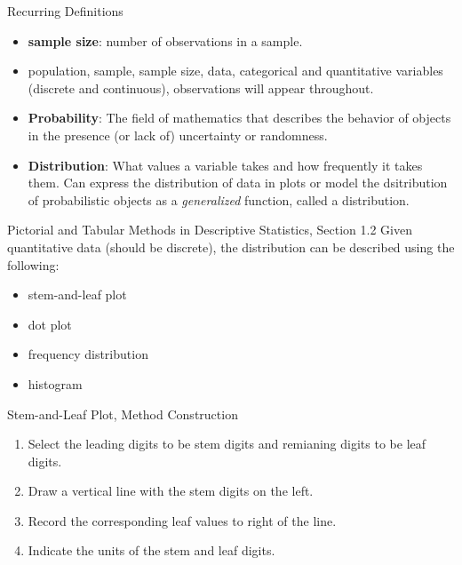 \documentclass{beamer}
\newcommand{\blue}[1]{{\color{blue} #1}}
\newcommand{\red}[1]{{\color{red} #1}}
\begin{document}
\begin{frame}{Recurring Definitions}
    \begin{itemize}
        \item {\bf sample size}: number of observations in a sample.
        \item population, sample, sample size, data, categorical and quantitative variables (discrete and continuous), observations will appear throughout.
        \item {\bf Probability}: The field of mathematics that describes the behavior of objects in the presence (or lack of) uncertainty or randomness.
        \item {\bf Distribution}:  What values a variable takes and how frequently it takes them. Can express the distribution of  data in plots or model the dsitribution of probabilistic objects as a {\it generalized} function, called a distribution.
    \end{itemize}
\end{frame}

\begin{frame}{Pictorial and Tabular Methods in Descriptive Statistics, Section 1.2}
    Given quantitative data (should be discrete), the distribution can be described using the following:
    \begin{itemize}
        \item stem-and-leaf plot
        \item dot plot
        \item frequency distribution
        \item histogram
    \end{itemize}
\end{frame}

\begin{frame}{Stem-and-Leaf Plot, Method}
    Construction
    \begin{enumerate}
        \item Select the \blue{leading} digits to be \blue{stem} digits and \red{remianing} digits to be \red{leaf} digits.
        \item Draw a vertical line with the \blue{stem} digits on the left.
        \item Record the corresponding \red{leaf} values to right of the line.
        \item Indicate the units of the \red{stem} and \blue{leaf} digits.
    \end{enumerate}
\end{frame}
\end{document}
